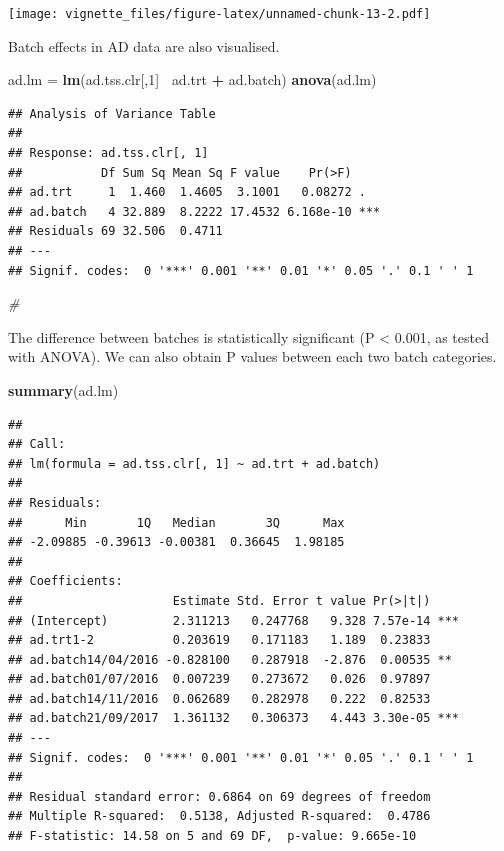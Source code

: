 \documentclass[]{book}
\newenvironment{Shaded}{\begin{snugshade}}{\end{snugshade}}
\newcommand{\KeywordTok}[1]{\textcolor[rgb]{0.13,0.29,0.53}{\textbf{#1}}}
\newcommand{\DecValTok}[1]{\textcolor[rgb]{0.00,0.00,0.81}{#1}}
\newcommand{\StringTok}[1]{\textcolor[rgb]{0.31,0.60,0.02}{#1}}
\newcommand{\CommentTok}[1]{\textcolor[rgb]{0.56,0.35,0.01}{\textit{#1}}}
\newcommand{\OperatorTok}[1]{\textcolor[rgb]{0.81,0.36,0.00}{\textbf{#1}}}
\newcommand{\NormalTok}[1]{#1}
\begin{document}
\texttt{[image: vignette\_files/figure-latex/unnamed-chunk-13-2.pdf]}

Batch effects in AD data are also visualised.

\begin{Shaded}
\begin{Highlighting}[]
\NormalTok{ad.lm =}\StringTok{ }\KeywordTok{lm}\NormalTok{(ad.tss.clr[,}\DecValTok{1}\NormalTok{]}\OperatorTok{~}\StringTok{ }\NormalTok{ad.trt }\OperatorTok{+}\StringTok{ }\NormalTok{ad.batch)}
\KeywordTok{anova}\NormalTok{(ad.lm)}
\end{Highlighting}
\end{Shaded}

\begin{verbatim}
## Analysis of Variance Table
## 
## Response: ad.tss.clr[, 1]
##           Df Sum Sq Mean Sq F value    Pr(>F)    
## ad.trt     1  1.460  1.4605  3.1001   0.08272 .  
## ad.batch   4 32.889  8.2222 17.4532 6.168e-10 ***
## Residuals 69 32.506  0.4711                      
## ---
## Signif. codes:  0 '***' 0.001 '**' 0.01 '*' 0.05 '.' 0.1 ' ' 1
\end{verbatim}

\begin{Shaded}
\begin{Highlighting}[]
\CommentTok{#}
\end{Highlighting}
\end{Shaded}

The difference between batches is statistically significant (P
\textless{} 0.001, as tested with ANOVA). We can also obtain P values
between each two batch categories.

\begin{Shaded}
\begin{Highlighting}[]
\KeywordTok{summary}\NormalTok{(ad.lm)}
\end{Highlighting}
\end{Shaded}

\begin{verbatim}
## 
## Call:
## lm(formula = ad.tss.clr[, 1] ~ ad.trt + ad.batch)
## 
## Residuals:
##      Min       1Q   Median       3Q      Max 
## -2.09885 -0.39613 -0.00381  0.36645  1.98185 
## 
## Coefficients:
##                     Estimate Std. Error t value Pr(>|t|)    
## (Intercept)         2.311213   0.247768   9.328 7.57e-14 ***
## ad.trt1-2           0.203619   0.171183   1.189  0.23833    
## ad.batch14/04/2016 -0.828100   0.287918  -2.876  0.00535 ** 
## ad.batch01/07/2016  0.007239   0.273672   0.026  0.97897    
## ad.batch14/11/2016  0.062689   0.282978   0.222  0.82533    
## ad.batch21/09/2017  1.361132   0.306373   4.443 3.30e-05 ***
## ---
## Signif. codes:  0 '***' 0.001 '**' 0.01 '*' 0.05 '.' 0.1 ' ' 1
## 
## Residual standard error: 0.6864 on 69 degrees of freedom
## Multiple R-squared:  0.5138, Adjusted R-squared:  0.4786 
## F-statistic: 14.58 on 5 and 69 DF,  p-value: 9.665e-10
\end{verbatim}
\end{document}
